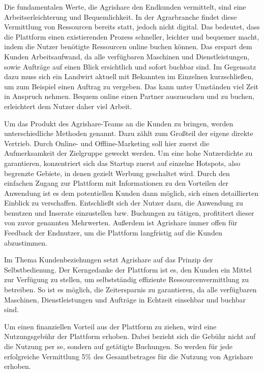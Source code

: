 Die fundamentalen Werte, die Agrishare den Endkunden vermittelt, sind eine Arbeitserleichterung und Bequemlichkeit. In der Agrarbranche findet diese Vermittlung von Ressourcen bereits statt, jedoch nicht digital. Das bedeutet, dass die Plattform einen existierenden Prozess schneller, leichter und bequemer macht, indem die Nutzer benötigte Ressourcen online buchen können. Das erspart dem Kunden Arbeitsaufwand, da alle verfügbaren Maschinen und Dienstleistungen, sowie Aufträge auf einen Blick ersichtlich und sofort buchbar sind. Im Gegensatz dazu muss sich ein Landwirt aktuell mit Bekannten im Einzelnen kurzschließen, um zum Beispiel einen Auftrag zu vergeben. Das kann unter Umständen viel Zeit in Anspruch nehmen. Bequem online einen Partner auszusuchen und zu buchen, erleichtert dem Nutzer daher viel Arbeit.

Um das Produkt des Agrishare-Teams an die Kunden zu bringen, werden unterschiedliche Methoden genannt. Dazu zählt zum Großteil der eigene direkte Vertrieb. Durch Online- und Offline-Marketing soll hier zuerst die Aufmerksamkeit der Zielgruppe geweckt werden. Um eine hohe Nutzerdichte zu garantieren, konzentriert sich das Startup zuerst auf einzelne Hotspots, also begrenzte Gebiete, in denen gezielt Werbung geschaltet wird. Durch den einfachen Zugang zur Plattform mit Informationen zu den Vorteilen der Anwendung ist es dem potentiellen Kunden dann möglich, sich einen detaillierten Einblick zu verschaffen. Entschließt sich der Nutzer dazu, die Anwendung zu benutzen und Inserate einzustellen bzw. Buchungen zu tätigen, profititert dieser von zuvor genannten Mehrwerten. Außerdem ist Agrishare immer offen für Feedback der Endnutzer, um die Plattform langfristig auf die Kunden abzustimmen.

Im Thema Kundenbeziehungen setzt Agrishare auf das Prinzip der Selbstbedienung. Der Kerngedanke der Plattform ist es, den Kunden ein Mittel zur Verfügung zu stellen, um selbstständig effiziente Ressourcenvermittlung zu betreiben. So ist es möglich, die Zeitersparnis zu garantieren, da alle verfügbaren Maschinen, Dienstleistungen und Aufträge in Echtzeit einsehbar und buchbar sind. 

Um einen finanziellen Vorteil aus der Plattform zu ziehen, wird eine Nutzungsgebühr der Plattform erhoben. Dabei bezieht sich die Gebühr nicht auf die Nutzung per se, sondern auf getätigte Buchungen. So werden für jede erfolgreiche Vermittlung 5\% des Gesamtbetrages für die Nutzung von Agrishare erhoben.

